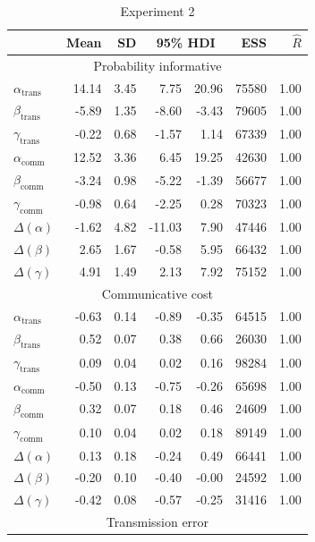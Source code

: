 \documentclass[doc,biblatex]{apa7}
\begin{document}
\begin{table}[h]
\begin{center}
\begin{threeparttable}
\caption{Experiment 2}
\footnotesize
\begin{tabular}{lrrrrrr}
\toprule
 & Mean & SD & \multicolumn{2}{c}{95\% HDI} & ESS & $\hat{R}$ \\
\midrule
\multicolumn{7}{c}{Probability informative} \\
$\alpha_\mathrm{trans}$ & 14.14 & 3.45 & 7.75 & 20.96 & 75580 & 1.00 \\
$\beta_\mathrm{trans}$ & -5.89 & 1.35 & -8.60 & -3.43 & 79605 & 1.00 \\
$\gamma_\mathrm{trans}$ & -0.22 & 0.68 & -1.57 & 1.14 & 67339 & 1.00 \\
$\alpha_\mathrm{comm}$ & 12.52 & 3.36 & 6.45 & 19.25 & 42630 & 1.00 \\
$\beta_\mathrm{comm}$ & -3.24 & 0.98 & -5.22 & -1.39 & 56677 & 1.00 \\
$\gamma_\mathrm{comm}$ & -0.98 & 0.64 & -2.25 & 0.28 & 70323 & 1.00 \\
$\Delta(\alpha)$ & -1.62 & 4.82 & -11.03 & 7.90 & 47446 & 1.00 \\
$\Delta(\beta)$ & 2.65 & 1.67 & -0.58 & 5.95 & 66432 & 1.00 \\
$\Delta(\gamma)$ & 4.91 & 1.49 & 2.13 & 7.92 & 75152 & 1.00 \\
\midrule
\multicolumn{7}{c}{Communicative cost} \\
$\alpha_\mathrm{trans}$ & -0.63 & 0.14 & -0.89 & -0.35 & 64515 & 1.00 \\
$\beta_\mathrm{trans}$ & 0.52 & 0.07 & 0.38 & 0.66 & 26030 & 1.00 \\
$\gamma_\mathrm{trans}$ & 0.09 & 0.04 & 0.02 & 0.16 & 98284 & 1.00 \\
$\alpha_\mathrm{comm}$ & -0.50 & 0.13 & -0.75 & -0.26 & 65698 & 1.00 \\
$\beta_\mathrm{comm}$ & 0.32 & 0.07 & 0.18 & 0.46 & 24609 & 1.00 \\
$\gamma_\mathrm{comm}$ & 0.10 & 0.04 & 0.02 & 0.18 & 89149 & 1.00 \\
$\Delta(\alpha)$ & 0.13 & 0.18 & -0.24 & 0.49 & 66441 & 1.00 \\
$\Delta(\beta)$ & -0.20 & 0.10 & -0.40 & -0.00 & 24592 & 1.00 \\
$\Delta(\gamma)$ & -0.42 & 0.08 & -0.57 & -0.25 & 31416 & 1.00 \\
\midrule
\multicolumn{7}{c}{Transmission error} \\

\end{tabular}
\end{threeparttable}
\end{center}
\end{table}
\end{document}
